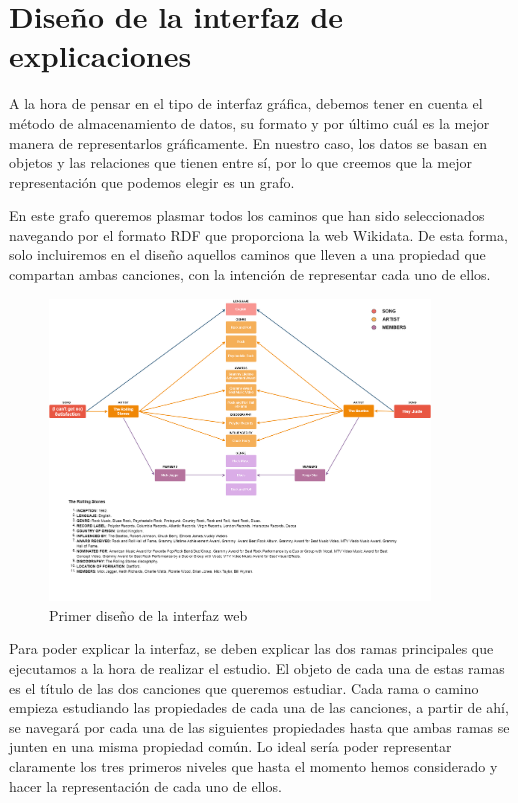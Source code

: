 \chapter{Diseño de la interfaz de explicaciones}
\label{cap:interfaz}

A la hora de pensar en el tipo de interfaz gráfica, debemos tener en cuenta el método de almacenamiento de datos, su formato y por último cuál es la mejor manera de representarlos gráficamente. En nuestro caso, los datos se basan en objetos y las relaciones que tienen entre sí, por lo que creemos que la mejor representación que podemos elegir es un grafo.

En este grafo queremos plasmar todos los caminos que han sido seleccionados navegando por el formato RDF que proporciona la web Wikidata. De esta forma, solo incluiremos en el diseño aquellos caminos que lleven a una propiedad que compartan ambas canciones, con la intención de representar cada uno de ellos.

\begin{figure}[h!]
	\centering
	\includegraphics[width = 0.9\textwidth]{Imagenes/Bitmap/InterfaceResult.png}
	\caption{Primer diseño de la interfaz web}
	\label{fig:sampleImage}
\end{figure}

Para poder explicar la interfaz, se deben explicar las dos ramas principales que ejecutamos a la hora de realizar el estudio. El objeto de cada una de estas ramas es el título de las dos canciones que queremos estudiar. Cada rama o camino empieza estudiando las propiedades de cada una de las canciones, a partir de ahí, se navegará por cada una de las siguientes propiedades hasta que ambas ramas se junten en una misma propiedad común.
Lo ideal sería poder representar claramente los tres primeros niveles que hasta el momento hemos considerado y hacer la representación de cada uno de ellos.

